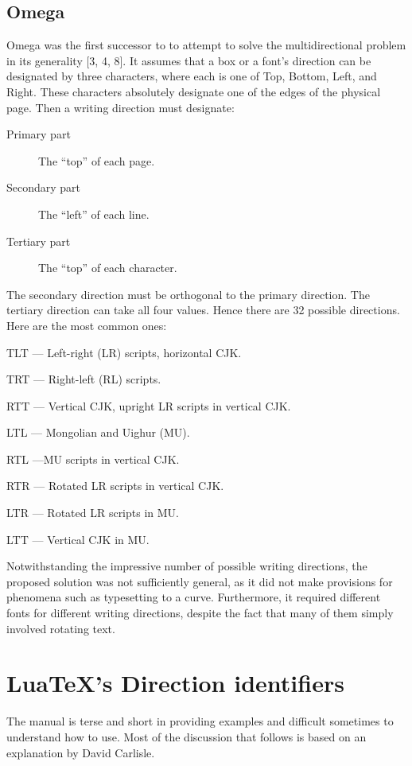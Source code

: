 \subsection{Omega}

Omega was the first successor to \tex to attempt to solve the multidirectional problem in its generality [3,
4, 8]. It assumes that a box or a font’s direction can be designated by three characters, where each is one
of Top, Bottom, Left, and Right. These characters absolutely designate one of the edges of the physical
page. Then a writing direction must designate:

\begin{description}
\item [Primary part] The \enquote{top} of each page.
\item [Secondary part] The \enquote{left} of each line.
\item [Tertiary part] The \enquote{top} of each character.
\end{description}

The secondary direction must be orthogonal to the
primary direction. The tertiary direction can take all
four values. Hence there are 32 possible directions.
Here are the most common ones:

TLT — Left-right (LR) scripts, horizontal CJK.

TRT — Right-left (RL) scripts.

RTT — Vertical CJK, upright LR scripts in vertical
CJK.

LTL — Mongolian and Uighur (MU).

RTL —MU scripts in vertical CJK.

RTR — Rotated LR scripts in vertical CJK.

LTR — Rotated LR scripts in MU.

LTT — Vertical CJK in MU.

Notwithstanding the impressive number of possible
writing directions, the proposed solution was not
sufficiently general, as it did not make provisions for
phenomena such as typesetting to a curve. Furthermore,
it required different fonts for different writing
directions, despite the fact that many of them simply
involved rotating text.




\section{LuaTeX's Direction identifiers}

The \luatex manual is terse and short in providing examples and difficult sometimes to understand how to use. Most of the discussion that follows is based on an explanation by David Carlisle.

